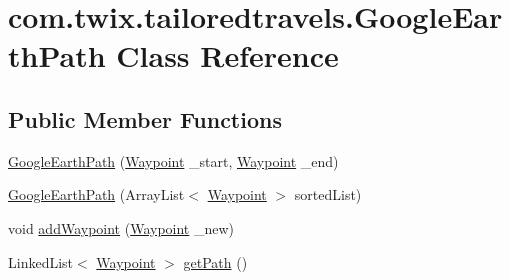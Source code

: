 \hypertarget{classcom_1_1twix_1_1tailoredtravels_1_1_google_earth_path}{\section{com.\-twix.\-tailoredtravels.\-Google\-Earth\-Path Class Reference}
\label{classcom_1_1twix_1_1tailoredtravels_1_1_google_earth_path}
}
\subsection*{Public Member Functions}
\begin{DoxyCompactItemize}
\item 
\hyperlink{classcom_1_1twix_1_1tailoredtravels_1_1_google_earth_path_aa15740bee3373d47996df6c15a35f221}{Google\-Earth\-Path} (\hyperlink{classcom_1_1twix_1_1tailoredtravels_1_1_waypoint}{Waypoint} \-\_\-start, \hyperlink{classcom_1_1twix_1_1tailoredtravels_1_1_waypoint}{Waypoint} \-\_\-end)
\item 
\hyperlink{classcom_1_1twix_1_1tailoredtravels_1_1_google_earth_path_a1da903f382a47ac383873b558fe093e4}{Google\-Earth\-Path} (Array\-List$<$ \hyperlink{classcom_1_1twix_1_1tailoredtravels_1_1_waypoint}{Waypoint} $>$ sorted\-List)
\item 
void \hyperlink{classcom_1_1twix_1_1tailoredtravels_1_1_google_earth_path_a8a45aedd969a5ecdfdaccee3cc83a449}{add\-Waypoint} (\hyperlink{classcom_1_1twix_1_1tailoredtravels_1_1_waypoint}{Waypoint} \-\_\-new)
\item 
Linked\-List$<$ \hyperlink{classcom_1_1twix_1_1tailoredtravels_1_1_waypoint}{Waypoint} $>$ \hyperlink{classcom_1_1twix_1_1tailoredtravels_1_1_google_earth_path_add0dbbb86bc1b39af5a41baec63c2577}{get\-Path} ()
\end{DoxyCompactItemize}


